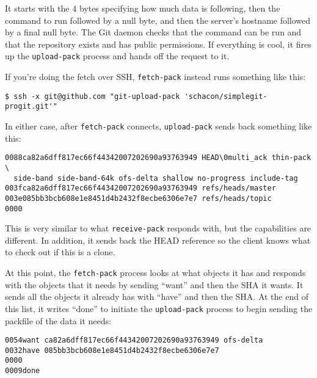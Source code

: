 \documentclass[a4paper]{book}
\begin{document}
It starts with the 4 bytes specifying how much data is following, then the command to run followed by a null byte, and then the server's hostname followed by a final null byte. The Git daemon checks that the command can be run and that the repository exists and has public permissions. If everything is cool, it fires up the \texttt{upload-pack} process and hands off the request to it.

If you're doing the fetch over SSH, \texttt{fetch-pack} instead runs something like this:

\begin{shaded}\begin{verbatim}
$ ssh -x git@github.com "git-upload-pack 'schacon/simplegit-progit.git'"
\end{verbatim}\end{shaded}

In either case, after \texttt{fetch-pack} connects, \texttt{upload-pack} sends back something like this:

\begin{shaded}\begin{verbatim}
0088ca82a6dff817ec66f44342007202690a93763949 HEAD\0multi_ack thin-pack \
  side-band side-band-64k ofs-delta shallow no-progress include-tag
003fca82a6dff817ec66f44342007202690a93763949 refs/heads/master
003e085bb3bcb608e1e8451d4b2432f8ecbe6306e7e7 refs/heads/topic
0000
\end{verbatim}\end{shaded}

This is very similar to what \texttt{receive-pack} responds with, but the capabilities are different. In addition, it sends back the HEAD reference so the client knows what to check out if this is a clone.

At this point, the \texttt{fetch-pack} process looks at what objects it has and responds with the objects that it needs by sending “want” and then the SHA it wants. It sends all the objects it already has with “have” and then the SHA. At the end of this list, it writes “done” to initiate the \texttt{upload-pack} process to begin sending the packfile of the data it needs:

\begin{shaded}\begin{verbatim}
0054want ca82a6dff817ec66f44342007202690a93763949 ofs-delta
0032have 085bb3bcb608e1e8451d4b2432f8ecbe6306e7e7
0000
0009done
\end{verbatim}\end{shaded}
\end{document}
